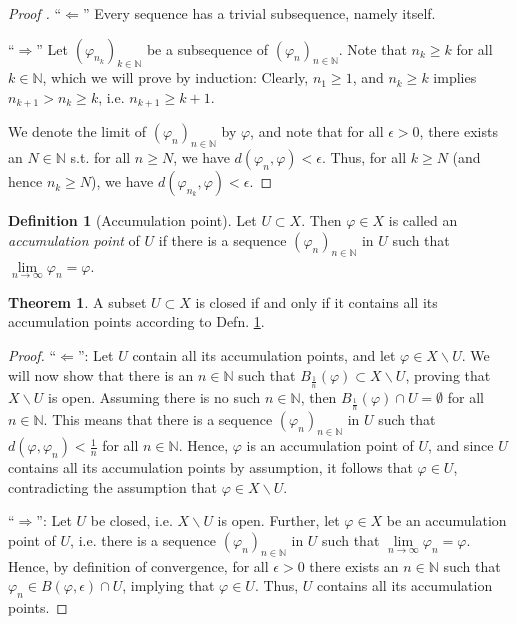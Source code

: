 \documentclass[12pt, a4paper]{article}
\numberwithin{equation}{section}
\theoremstyle{definition}
\theoremstyle{definition}
\newtheorem{defn}[thm]{Definition} %
\newtheorem{theorem}[thm]{Theorem}
\newcommand{\seq}[1][\varphi]{\left( #1 \right)_{n \in \mathbb{N}}}
\begin{document}
	\begin{proof}[Proof \cite{213285}]
		\enquote{$\Longleftarrow$} Every sequence has a trivial subsequence, namely itself.
		
		\enquote{$\Longrightarrow$} Let $\left(\varphi_{n_k}\right)_{k\in\mathbb N}$ be a subsequence of $\seq[\varphi_n]$. Note that $n_k \geq k$ for all $k\in\mathbb N$, which we will prove by induction: Clearly, $n_1\geq 1$, and $n_k\geq k$ implies $n_{k + 1} > n_{k} \geq k$, i.e. $n_{k + 1}\geq k + 1$. 
		
		We denote the limit of $\seq[\varphi_n]$ by $\varphi$, and note that for all $\epsilon > 0$, there exists an $N\in\mathbb N$ s.t. for all $n \geq N$, we have $d(\varphi_n, \varphi) < \epsilon$. Thus, for all $k\geq N$ (and hence $n_k\geq N$), we have $d(\varphi_{n_k}, \varphi) < \epsilon$.
	\end{proof}

	\begin{defn}[Accumulation point]\label{defn:accumulation_point}
		Let $U\subset X$. Then $\varphi\in X$ is called an \textit{accumulation point} of $U$ if there is a sequence $\left(\varphi_{n}\right)_{n\in \mathbb N}$ in $U$ such that $\lim\limits_{n\to\infty}\varphi_{n} = \varphi$.
	\end{defn}

	\begin{theorem}\label{thm:closed_set_acc_point}
		A subset $U \subset X$ is closed if and only if it contains all its accumulation points according to Defn. \ref{defn:accumulation_point}.
	\end{theorem}

	\begin{proof}
		\enquote{$\Longleftarrow$}: Let $U$ contain all its accumulation points, and let $\varphi\in X\backslash U$. We will now show that there is an $n\in \mathbb N$ such that $B_{\frac{1}{n}}(\varphi) \subset X\backslash U$, proving that $X\backslash U$ is open. Assuming there is no such $n\in \mathbb N$, then $B_{\frac{1}{n}}(\varphi) \cap U = \emptyset$ for all $n\in \mathbb N$. This means that there is a sequence $(\varphi_{n})_{n\in\mathbb N}$ in $U$ such that $d(\varphi, \varphi_n) < \frac{1}{n}$ for all $n\in\mathbb N$. Hence, $\varphi$ is an accumulation point of $U$, and since $U$ contains all its accumulation points by assumption, it follows that $\varphi\in U$, contradicting the assumption that $\varphi\in X\backslash U$.
		
		\enquote{$\Longrightarrow$}: Let $U$ be closed, i.e. $X\backslash U$ is open. Further, let $\varphi\in X$ be an accumulation point of $U$, i.e. there is a sequence $(\varphi_n)_{n\in\mathbb N}$ in $U$ such that $\lim\limits_{n\to\infty}\varphi_n = \varphi$. Hence, by definition of convergence, for all $\epsilon > 0$ there exists an $n\in\mathbb N$ such that $\varphi_n\in B(\varphi, \epsilon) \cap U$, implying that $\varphi\in U$. Thus, $U$ contains all its accumulation points.
	\end{proof}
	
\end{document}
